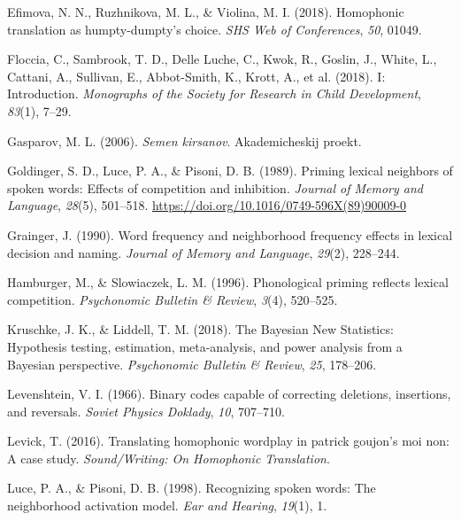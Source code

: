\documentclass[
  man,
  longtable,
  nolmodern,
  notxfonts,
  notimes,
  colorlinks=true,linkcolor=blue,citecolor=blue,urlcolor=blue]{apa7}
\newlength{\cslhangindent}
\newenvironment{CSLReferences}[2] %
 {\begin{list}{}{%
  \setlength{\itemindent}{0pt}
  \setlength{\leftmargin}{0pt}
  \setlength{\parsep}{0pt}
  \ifodd #1
   \setlength{\leftmargin}{\cslhangindent}
   \setlength{\itemindent}{-1\cslhangindent}
  \fi
  \setlength{\itemsep}{#2\baselineskip}}}
 {\end{list}}
\begin{document}
\begin{CSLReferences}{1}{0}
Efimova, N. N., Ruzhnikova, M. L., \& Violina, M. I. (2018). Homophonic
translation as humpty-dumpty's choice. \emph{SHS Web of Conferences},
\emph{50}, 01049.

Floccia, C., Sambrook, T. D., Delle Luche, C., Kwok, R., Goslin, J.,
White, L., Cattani, A., Sullivan, E., Abbot-Smith, K., Krott, A., et al.
(2018). I: {Introduction}. \emph{Monographs of the Society for Research
in Child Development}, \emph{83}(1), 7--29.

Gasparov, M. L. (2006). \emph{Semen kirsanov}. Akademicheskij proekt.

Goldinger, S. D., Luce, P. A., \& Pisoni, D. B. (1989). Priming lexical
neighbors of spoken words: {Effects} of competition and inhibition.
\emph{Journal of Memory and Language}, \emph{28}(5), 501--518.
\url{https://doi.org/10.1016/0749-596X(89)90009-0}

Grainger, J. (1990). Word frequency and neighborhood frequency effects
in lexical decision and naming. \emph{Journal of Memory and Language},
\emph{29}(2), 228--244.

Hamburger, M., \& Slowiaczek, L. M. (1996). Phonological priming
reflects lexical competition. \emph{Psychonomic Bulletin \& Review},
\emph{3}(4), 520--525.

Kruschke, J. K., \& Liddell, T. M. (2018). The {Bayesian New
Statistics}: {Hypothesis} testing, estimation, meta-analysis, and power
analysis from a {Bayesian} perspective. \emph{Psychonomic Bulletin \&
Review}, \emph{25}, 178--206.

Levenshtein, V. I. (1966). Binary codes capable of correcting deletions,
insertions, and reversals. \emph{Soviet Physics Doklady}, \emph{10},
707--710.

Levick, T. (2016). Translating homophonic wordplay in patrick goujon's
moi non: A case study. \emph{Sound/Writing: On Homophonic Translation}.

Luce, P. A., \& Pisoni, D. B. (1998). Recognizing spoken words: {The}
neighborhood activation model. \emph{Ear and Hearing}, \emph{19}(1), 1.


\end{CSLReferences}
\end{document}
